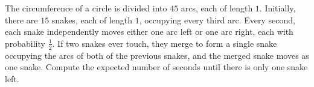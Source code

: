 The circumference of a circle is divided into $45$ arcs, each of length $1$. Initially, there are $15$ snakes, each of length $1$, occupying every third arc. Every second, each snake independently moves either one arc left or one arc right, each with probability $\frac{1}{2}$. If two snakes ever touch, they merge to form a single snake occupying the arcs of both of the previous snakes, and the merged snake moves as one snake. Compute the expected number of seconds until there is only one snake left.